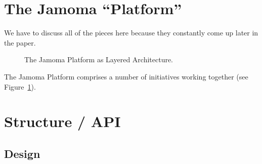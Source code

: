 \documentclass[twoside,10pt]{article}
\begin{document}
\section{The Jamoma ``Platform''} %

We have to discuss all of the pieces here because they constantly come up later in the paper.

\begin{figure}[htbp]
\centerline{}
\caption{The Jamoma Platform as Layered Architecture.}
\label{fig:layers}
\end{figure}

The Jamoma Platform comprises a number of initiatives working together
(see Figure~\ref{fig:layers}).





\section{Structure / API} %

\subsection{Design}
\end{document}
